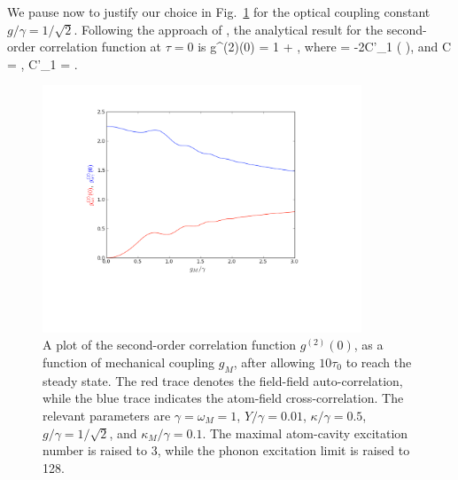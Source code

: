 We pause now to justify our choice in Fig.~\ref{fig7g20} for the optical coupling constant $g/\gamma = 1/\sqrt{2}$. Following the approach of \cite{howard1991}, the analytical result for the second-order correlation function at $\tau = 0$ is
%
\be g^{(2)}(0) = 1 + \frac{\Delta\alpha}{\alpha}, \label{eq4.3} \ee
%
where
%
\be \frac{\Delta\alpha}{\alpha} = -2C'_1 \left(  \right), \label{eq4.4} \ee
%
and
%
\be C = , \quad C'_1 = . \label{eq4.5} \ee
%
\newpage
\begin{figure}[htb]
\begin{center}
\includegraphics[width=0.85\textwidth]{Figures/7g20}
\caption[A plot of $g^{(2)}(0)$ in the steady state as a function of $g_M$]{\small{A plot of the second-order correlation function $g^{(2)}(0)$, as a function of mechanical coupling $g_M$, after allowing $10\tau_0$ to reach the steady state. The red trace denotes the field-field auto-correlation, while the blue trace indicates the atom-field cross-correlation. The relevant parameters are $\gamma = \omega_M = 1$, $Y/\gamma = 0.01$, $\kappa/\gamma = 0.5$, $g/\gamma = 1/\sqrt{2}$, and $\kappa_M/\gamma = 0.1$. The maximal atom-cavity excitation number is raised to 3, while the phonon excitation limit is raised to 128.}}
\label{fig7g20}
\end{center}
\end{figure}

